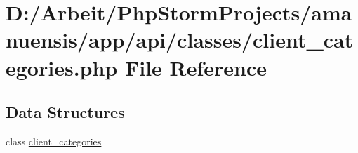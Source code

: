 \hypertarget{client__categories_8php}{}\section{D\+:/\+Arbeit/\+Php\+Storm\+Projects/amanuensis/app/api/classes/client\+\_\+categories.php File Reference}
\label{client__categories_8php}
\subsection*{Data Structures}
\begin{DoxyCompactItemize}
\item 
class \hyperlink{classclient__categories}{client\+\_\+categories}
\end{DoxyCompactItemize}
